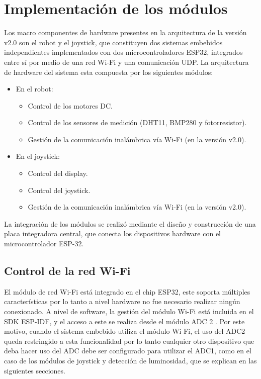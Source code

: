 \section{Implementación de los módulos}

Los macro componentes de hardware presentes en la arquitectura de la versión v2.0 son el robot y el joystick, que constituyen dos sistemas embebidos independientes implementados con dos microcontroladores ESP32, integrados entre sí por medio de una red Wi-Fi y una comunicación UDP. La arquitectura de hardware del sistema esta compuesta por los siguientes módulos:


\begin{itemize}
	\item En el robot:
	\begin{itemize}
		\item Control de los motores DC.	
		\item Control de los sensores de medición (DHT11, BMP280 y fotorresistor).
		\item Gestión de la  comunicación inalámbrica vía Wi-Fi (en la versión v2.0).
	\end{itemize}
	\item En el joystick:
	\begin{itemize}
		\item Control del display.
		\item Control del joystick.
		\item Gestión de la  comunicación inalámbrica vía Wi-Fi (en la versión v2.0).
	\end{itemize}
\end{itemize}

La integración de los módulos se realizó mediante el diseño y construcción de una placa integradora central, que conecta los dispositivos hardware con el microcontrolador ESP-32.


\subsection{Control de la red Wi-Fi}

El módulo de red Wi-Fi está integrado en el chip ESP32, este soporta múltiples características \cite{ESP32_WiFi} por lo tanto a nivel hardware no fue necesario realizar ningún conexionado.
A nivel de software, la gestión del módulo Wi-Fi está incluida en el SDK ESP-IDF, y el acceso a este se realiza desde el módulo ADC 2 \cite{ESP32_adc}. Por este motivo, cuando el sistema embebido utiliza el módulo Wi-Fi, el uso del ADC2 queda restringido a esta funcionalidad por lo tanto cualquier otro dispositivo que deba hacer uso del ADC debe ser configurado para utilizar el ADC1, como en el caso de los módulos de joystick y detección de luminosidad, que se explican en las siguientes secciones.

